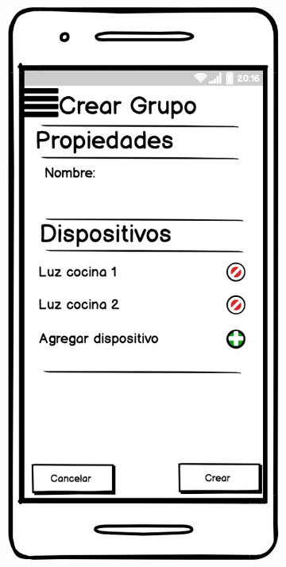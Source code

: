 \begin{figure}[H]
\begin{subfigure}[b]{0.20\textwidth}
    \label{fig:balsamiq}
  \end{subfigure}
  \begin{subfigure}[b]{0.20\textwidth}
    \includegraphics[width=\textwidth, keepaspectratio]{images/balsamiq08}

\end{subfigure}
\end{figure}
